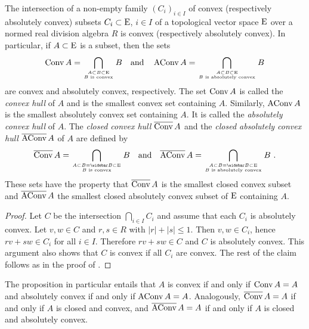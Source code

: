 \begin{propanddef}\label{thm:absolutely-convex-hulls}
  The intersection of a non-empty family $(C_i)_{i\in I}$ of convex (respectively absolutely convex) subsets
  $C_i \subset \mathrm{E}$, $i\in I$ of a topological vector space $\mathrm{E}$ over a normed real division algebra $R$
  is convex (respectively absolutely convex).
  In particular, if $A \subset \mathrm{E}$ is a subset, then the sets
  \[
    \operatorname{Conv} A = \bigcap\limits_{A \subset B \subset \mathrm{E} \atop {B \text{ is convex}} }  B \quad \text{and} \quad
    \operatorname{AConv} A = \bigcap\limits_{A \subset B \subset \mathrm{E} \atop {B \text{ is absolutely convex}} }  B
  \]
  are convex and absolutely convex, respectively. The set $\operatorname{Conv} A$ is called the \emph{convex hull} of $A$
  and is the smallest convex set containing $A$. Similarly, $\operatorname{AConv} A$ is the smallest absolutely convex set
  containing $A$. It is called the  \emph{absolutely convex hull} of $A$.
  The \emph{closed convex hull} $\overline{\operatorname{Conv}}\, A$ and the \emph{closed absolutely convex hull} $\overline{\operatorname{AConv}}\, A$
  of $A$ are defined by  
  \[
    \clconvHull A = \bigcap\limits_{A \subset B = \closure{B} \subset \vectorspE \atop {B \text{ is convex}} }  B
    \quad \text{and} \quad
    \clabsconvHull A = \bigcap\limits_{A \subset B = \closure{B} \subset \vectorspE \atop {B \text{ is absolutely convex}} }  B \ .
  \]
  These sets have the property that $\overline{\operatorname{Conv}}\, A$ is the smallest closed convex subset
  and $\overline{\operatorname{AConv}}\, A$ the smallest closed absolutely convex subset of $\mathrm{E}$ containing $A$.
\end{propanddef}

\begin{proof}
  Let $C$ be the intersection $\bigcap\limits_{i\in I} C_i$ and assume that each $C_i$ is absolutely convex.
  Let $v,w\in C$ and $r,s \in R$ with $|r|+|s|\leq 1$. Then $v,w\in C_i$, hence  $rv + sw \in C_i$ for all $i\in I$. Therefore
  $rv +sw \in C$ and $C$ is absolutely convex. This argument also shows that $C$ is convex if all $C_i$ are convex.
  The rest of the claim follows as in the proof  of .
\end{proof}

\begin{remark}
  The proposition in particular entails that $A$ is convex if and only if $\operatorname{Conv} A = A$ and
  absolutely convex if and only if $\operatorname{AConv} A = A$. Analogously,
  $\overline{\operatorname{Conv}}\, A = A$ if and only if $A$ is closed and convex,
  and $\overline{\operatorname{AConv}}\, A = A$ if and only if $A$ is closed and absolutely convex. 
\end{remark}

